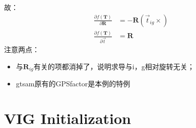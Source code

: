 \documentclass{article}
\begin{document}
故：
\begin{equation}
	\begin{aligned}
		\frac{\partial{f(\boldsymbol{T})}}{\partial{\boldsymbol{R}}} & = -\boldsymbol{R}(\vec{t}_{ig}\times) \\
		\frac{\partial{f(\boldsymbol{T})}}{\partial{\vec{t}}} & = \boldsymbol{R}
	\end{aligned}
\end{equation}
注意两点：
\begin{itemize}
	\item  与$\boldsymbol{R}_{ig}$有关的项都消掉了，说明求导与i，g相对旋转无关；
	\item  gtsam原有的GPSfactor是本例的特例
\end{itemize}

\section{VIG Initialization}
	
\end{document}
